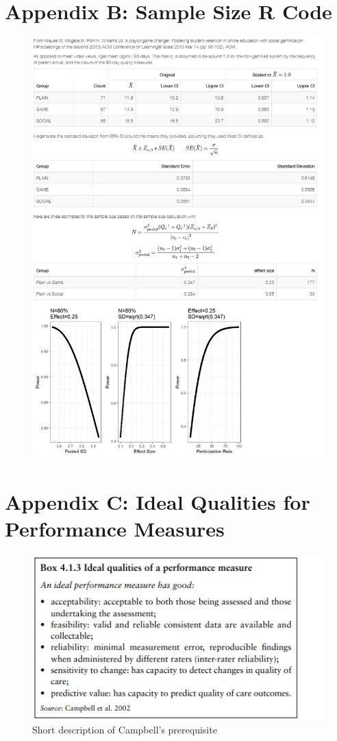 \documentclass[12pt]{memoir}
\begin{document}
\clearpage
\chapter{Appendix B: Sample Size R Code}
\begin{figure}[h]
    \centering
    \includegraphics[trim={25mm 10mm 10mm 0mm}, height=0.85\textheight]{img/sample-size.png}
\end{figure}

\clearpage
\chapter{Appendix C: Ideal Qualities for Performance Measures}
\begin{figure}[h]
    \centering
    \includegraphics[]{img/criteria-campbell.png}
    \caption{Short description of Campbell's prerequisite \cite{smith2009performance}}
\end{figure}
\end{document}
